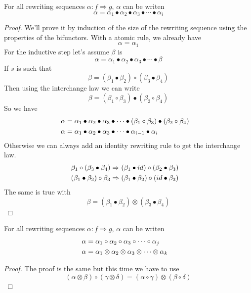 \documentclass[a4paper]{article}
\begin{document}
\begin{proposition}
For all rewriting sequences $\alpha: f \Rightarrow g$, $\alpha$ can be writen
\[
\alpha = \alpha_1 \bullet \alpha_2 \bullet \alpha_3 \bullet \cdots \bullet \alpha_i
\]

\begin{proof}
We'll prove it by induction of the size of the rewriting sequence using the
  properties of the bifunctors.
With a atomic rule, we already have
\[
\alpha = \alpha_1
\]
For the inductive step let's assume $\beta$ is
\[
\alpha = \alpha_1 \bullet \alpha_2 \bullet \alpha_3 \bullet \cdots \bullet \beta
\]
If $s$ is such that
\[
\beta = (\beta_1 \bullet \beta_2) \circ (\beta_3 \bullet \beta_4)
\]
Then using the interchange law we can write
\[
\beta = (\beta_1 \circ \beta_3) \bullet (\beta_2 \circ \beta_4)
\]
So we have 
\begin{align}
\alpha &= \alpha_1 \bullet \alpha_2 \bullet \alpha_3 \bullet \cdots \bullet
  (\beta_1 \circ \beta_3) \bullet (\beta_2 \circ \beta_4) \cr
\alpha &= \alpha_1 \bullet \alpha_2 \bullet \alpha_3 \bullet \cdots \bullet
  \alpha_{i - 1} \bullet \alpha_i
\end{align}
Otherwise we can always add an identity rewriting rule to get the interchange
  law.
\begin{align}
\beta_1 \circ (\beta_3 \bullet \beta_4) &\Rightarrow (\beta_1 \bullet id) \circ
  (\beta_2 \bullet \beta_3) \cr
(\beta_1 \bullet \beta_2) \circ \beta_3 &\Rightarrow (\beta_1 \bullet \beta_2)
  \circ (id \bullet \beta_3)
\end{align}
The same is true with
\[
\beta = (\beta_1 \bullet \beta_2) \otimes (\beta_3 \bullet \beta_4)
\]
\end{proof}
\end{proposition}

\begin{proposition}
For all rewriting sequences $\alpha: f \Rightarrow g$, $\alpha$ can be writen
\begin{align}
\alpha &= \alpha_1 \circ \alpha_2 \circ \alpha_3 \circ \cdots \circ \alpha_j \cr
\alpha &= \alpha_1 \otimes \alpha_2 \otimes \alpha_3 \otimes \cdots \otimes
  \alpha_k
\end{align}

\begin{proof}
The proof is the same but this time we have to use
\[
(\alpha \otimes \beta) \circ (\gamma \otimes \delta) = (\alpha \circ \gamma)
  \otimes (\beta \circ \delta)
\]
\end{proof}
\end{proposition}
\end{document}
